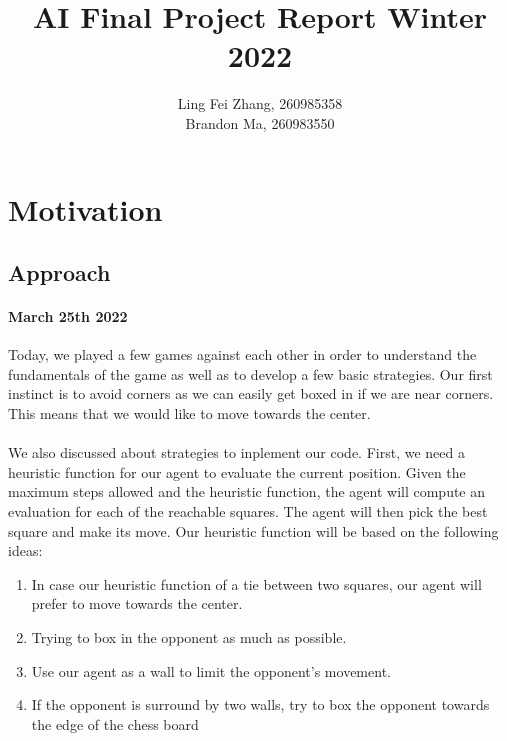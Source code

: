 \documentclass[12pt,a4paper]{article}
\author{Ling Fei Zhang, 260985358\\
Brandon Ma, 260983550}
\begin{document}
\title{AI Final Project Report Winter 2022}    
\maketitle
\section{Motivation}
\subsection{Approach}
\paragraph{March 25th 2022}
Today, we played a few games against each other in order to understand the fundamentals 
of the game as well as to develop a few basic strategies. Our first instinct is to avoid 
corners as we can easily get boxed in if we are near corners. This means that we would 
like to move towards the center. 
\paragraph{} We also discussed about strategies to inplement our code. First, we need a 
heuristic function for our agent to evaluate the current position. Given the maximum steps 
allowed and the heuristic function, the agent will compute an evaluation for each of the 
reachable squares. The agent will then pick the best square and make its move. Our heuristic 
function will be based on the following ideas:
\begin{enumerate}
    \item In case our heuristic function of a tie between two squares, our agent will prefer to move towards the center.
    \item Trying to box in the opponent as much as possible.
    \item Use our agent as a wall to limit the opponent's movement.
    \item If the opponent is surround by two walls, try to box the opponent towards the edge of the chess board
\end{enumerate}
\end{document}
